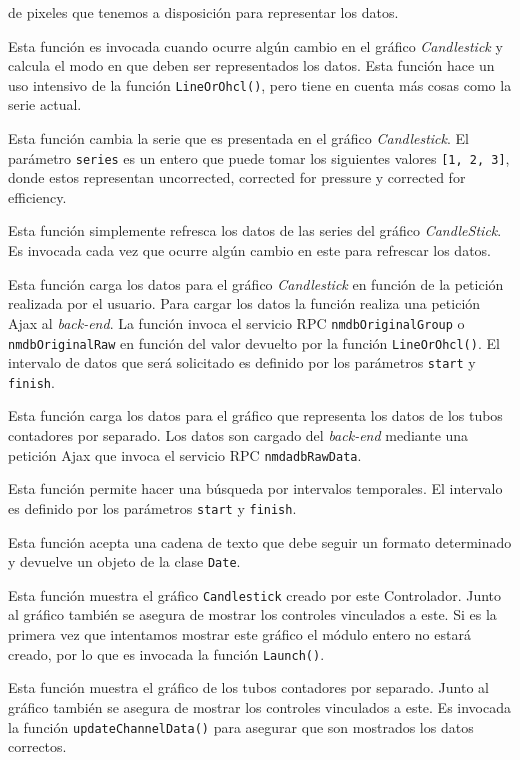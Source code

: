 \begin{description}[style=unboxed,leftmargin=0cm]
			  de pixeles que tenemos a disposición para representar los datos.
			\item[\texttt{updateMode(start, finish)}] Esta función es invocada cuando ocurre algún cambio en el gráfico \emph{Candlestick}
			  y calcula el modo en que deben ser representados los datos. Esta función hace un uso intensivo de la función
			  \texttt{LineOrOhcl()}, pero tiene en cuenta más cosas como la serie actual.
			\item[\texttt{changeSeries(series)}] Esta función cambia la serie que es presentada en el gráfico \emph{Candlestick}. El
			  parámetro \texttt{series} es un entero que puede tomar los siguientes valores \texttt{[1, 2, 3]}, donde estos representan
			  uncorrected, corrected for pressure y corrected for efficiency.
			\item[\texttt{updateSeries()}] Esta función simplemente refresca los datos de las series del gráfico \emph{CandleStick}. Es
			  invocada cada vez que ocurre algún cambio en este para refrescar los datos.
			\item[\texttt{updateCandleData(start, finish)}] Esta función carga los datos para el gráfico \emph{Candlestick} en función de
			  la petición realizada por el usuario. Para cargar los datos la función realiza una petición Ajax al \emph{back-end}. La
			  función invoca el servicio RPC \texttt{nmdbOriginalGroup} o \texttt{nmdbOriginalRaw} en función del valor devuelto por la
			  función \texttt{LineOrOhcl()}. El intervalo de datos que será solicitado es definido por los parámetros \texttt{start} y
			  \texttt{finish}. 
			\item[\texttt{updateChannelData()}] Esta función carga los datos para el gráfico que representa los datos de los tubos
			  contadores por separado. Los datos son cargado del \emph{back-end} mediante una petición Ajax que invoca el servicio RPC
			  \texttt{nmdadbRawData}.
			\item[\texttt{searchInterval(start, finish)}] Esta función permite hacer una búsqueda por intervalos temporales. El intervalo
			  es definido por los parámetros \texttt{start} y \texttt{finish}.
			\item[\texttt{getTimestamp(str)}] Esta función acepta una cadena de texto que debe seguir un formato determinado y devuelve un
			  objeto de la clase \texttt{Date}. 
			\item[\texttt{showCandle()}] Esta función muestra el gráfico \texttt{Candlestick} creado por este Controlador. Junto al
			  gráfico también se asegura de mostrar los controles vinculados a este. Si es la primera vez que intentamos mostrar este
			  gráfico el módulo entero no estará creado, por lo que es invocada la función \texttt{Launch()}.
			\item[\texttt{showChannel()}] Esta función muestra el gráfico de los tubos contadores por separado. Junto al gráfico también
			  se asegura de mostrar los controles vinculados a este. Es invocada la función \texttt{updateChannelData()} para asegurar que
			  son mostrados los datos correctos.
		\end{description}
